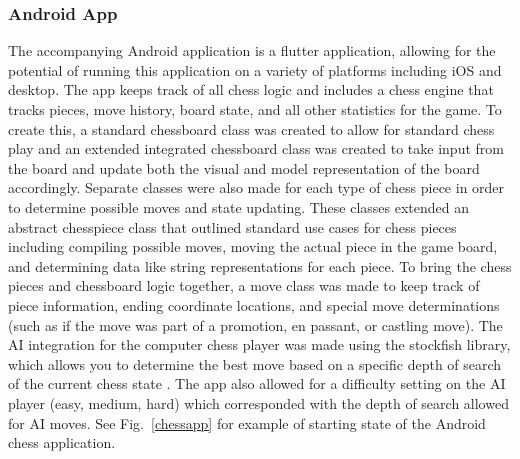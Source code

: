 \documentclass[11pt,journal]{IEEEtran}
\begin{document}
\subsubsection{Android App}
The accompanying Android application is a flutter application, allowing for the potential of running this application on a variety of platforms including iOS and desktop. The app keeps track of all chess logic and includes a chess engine that tracks pieces, move history, board state, and all other statistics for the game. To create this, a standard chessboard class was created to allow for standard chess play and an extended integrated chessboard class was created to take input from the board and update both the visual and model representation of the board accordingly. Separate classes were also made for each type of chess piece in order to determine possible moves and state updating. These classes extended an abstract chesspiece class that outlined standard use cases for chess pieces including compiling possible moves, moving the actual piece in the game board, and determining data like string representations for each piece. To bring the chess pieces and chessboard logic together, a move class was made to keep track of piece information, ending coordinate locations, and special move determinations (such as if the move was part of a promotion, en passant, or castling move). The AI integration for the computer chess player was made using the stockfish library, which allows you to determine the best move based on a specific depth of search of the current chess state \cite{stockfish}. The app also allowed for a difficulty setting on the AI player (easy, medium, hard) which corresponded with the depth of search allowed for AI moves. See Fig.~\ref{chessapp} for example of starting state of the Android chess application.
\end{document}
